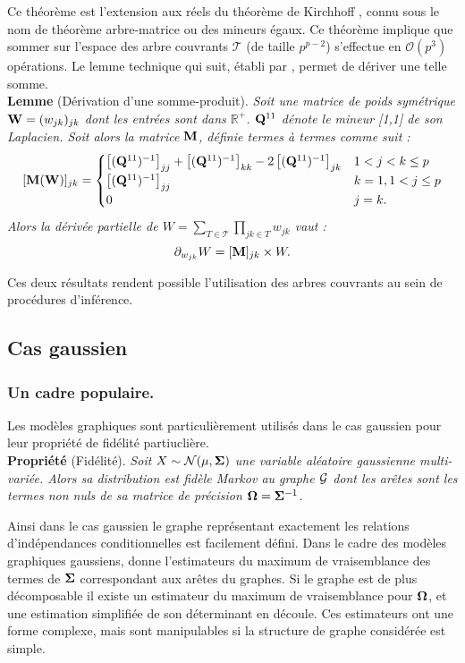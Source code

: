 Ce théorème est l'extension aux réels du théorème de Kirchhoff  \citep{matrixtree,MeilaJaak}, connu sous le nom de théorème arbre-matrice ou des mineurs égaux. Ce théorème implique que sommer sur l'espace des arbre couvrants $\mathcal{T}$ (de taille $p^{p-2}$) s'effectue en $\mathcal{O}(p^3)$ opérations. Le lemme technique qui suit, établi par \citet{MeilaJaak}, permet de dériver une telle somme.\\

\textbf{Lemme} (Dérivation d'une somme-produit). \textit{Soit une matrice de poids symétrique ${\bf W}=(w_{jk})_{jk}$ dont les entrées sont dans $\mathds{R}^+$. ${\bf Q}^{11}$ dénote le mineur [1,1] de son Laplacien. Soit alors la matrice ${\bf M}$, définie termes à termes comme suit :
\[    
 [{\bf M}({\bf W})]_{jk} =\begin{cases}
    \left[({\bf Q}^{11})^{-1}\right]_{jj} + \left[({\bf Q}^{11})^{-1}\right]_{kk} -2\left[({\bf Q}^{11})^{-1}\right]_{jk} & 1< j<k \leq p\\
    \left[({\bf Q}^{11})^{-1}\right]_{jj} & k=1, 1< j \leq p  \\
    0 &  j=k .
    \end{cases}
\] 
Alors la dérivée partielle de $W = \sum_{T\in\mathcal{T}} \prod_{jk\in T} w_{jk}$ vaut :
$$\partial_{w_{jk}} W = [{\bf M}]_{jk}  \times W.$$ }
   
Ces deux résultats rendent possible l'utilisation des arbres couvrants au sein de procédures d'inférence.
\subsection*{Cas gaussien}
\subsubsection*{Un cadre populaire.}
Les modèles graphiques sont particulièrement utilisés dans le cas gaussien pour leur propriété de fidélité partiuclière.\\

\textbf{Propriété} (Fidélité). \textit{Soit $X\sim \mathcal{N}(\mu, {\boldsymbol{\Sigma}})$ une variable aléatoire gaussienne multi-variée. Alors sa distribution est fidèle Markov au graphe $\mathcal{G}$ dont les arêtes sont les termes non nuls de sa matrice de précision ${\boldsymbol{\Omega}} = {\boldsymbol{\Sigma}}^{-1}$.\\}
  
  Ainsi dans le cas gaussien le graphe représentant exactement les relations d'indépendances conditionnelles est facilement défini. Dans le cadre des modèles graphiques gaussiens, \citet{Lau96} donne l'estimateurs du maximum de vraisemblance des termes de ${\boldsymbol{\Sigma}}$ correspondant aux arêtes du graphes. Si le graphe est de plus décomposable il existe un estimateur du maximum de vraisemblance pour ${\boldsymbol{\Omega}}$, et une estimation simplifiée de son déterminant en découle. Ces estimateurs ont une forme complexe, mais sont manipulables si la structure de graphe considérée est simple.\\
  
